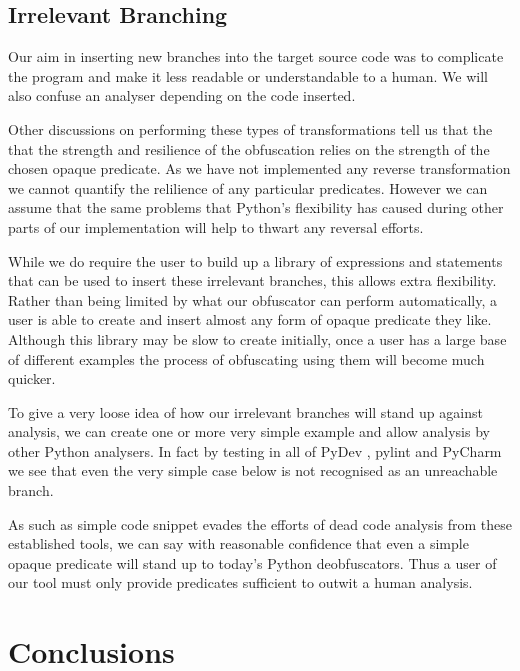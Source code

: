 \documentclass[twoside,a4paper]{report}
\begin{document}
\subsection{Irrelevant Branching}

Our aim in inserting new branches into the target source code was to complicate the program and make it less readable or understandable to a human. We will
also confuse an analyser depending on the code inserted.

Other discussions on performing these types of transformations \cite{taxobftrans} tell us that the that the strength and resilience of the obfuscation relies
on the strength of the chosen opaque predicate. As we have not implemented any reverse transformation we cannot quantify the relilience of any particular
predicates. However we can assume that the same problems that Python's flexibility has caused during other parts of our implementation will help to thwart
any reversal efforts.

While we do require the user to build up a library of expressions and statements that can be used to insert these irrelevant branches, this allows extra
flexibility. Rather than being limited by what our obfuscator can perform automatically, a user is able to create and insert almost any form of opaque
predicate they like. Although this library may be slow to create initially, once a user has a large base of different examples the process of obfuscating using
them will become much quicker.

To give a very loose idea of how our irrelevant branches will stand up against analysis, we can create one or more very simple example and allow analysis by
other Python analysers. In fact by testing in all of PyDev \cite{pydev}, pylint \cite{pylint} and PyCharm \cite{pycharm} we see that even the very
simple case below is not recognised as an unreachable branch.



As such as simple code snippet evades the efforts of dead code analysis from these established tools, we can say with reasonable confidence that even a
simple opaque predicate will stand up to today's Python deobfuscators. Thus a user of our tool must only provide predicates sufficient to outwit a human
analysis.

\section{Conclusions}
\end{document}
